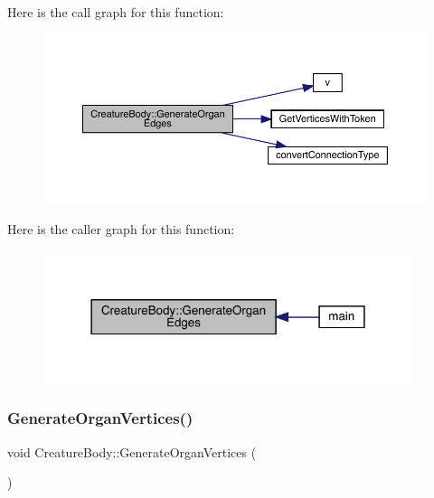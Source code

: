 Here is the call graph for this function\+:
\nopagebreak
\begin{figure}[H]
\begin{center}
\leavevmode
\includegraphics[width=350pt]{da/d7d/class_creature_body_af1303a40606bf06aed980f14e7027d54_cgraph}
\end{center}
\end{figure}
Here is the caller graph for this function\+:
\nopagebreak
\begin{figure}[H]
\begin{center}
\leavevmode
\includegraphics[width=306pt]{da/d7d/class_creature_body_af1303a40606bf06aed980f14e7027d54_icgraph}
\end{center}
\end{figure}
\mbox{\label{class_creature_body_a9cf5cffe6209ed851bf32c2b164d9391}} 
\subsubsection{\texorpdfstring{Generate\+Organ\+Vertices()}{GenerateOrganVertices()}}
{\footnotesize\ttfamily void Creature\+Body\+::\+Generate\+Organ\+Vertices (\begin{DoxyParamCaption}{ }\end{DoxyParamCaption})}

